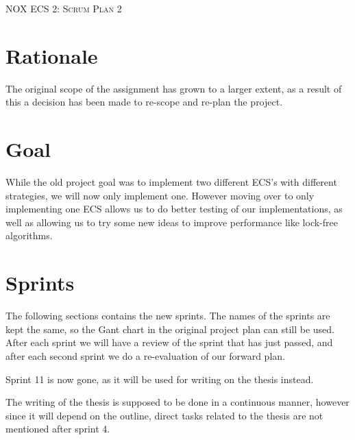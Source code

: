 \documentclass[hidelinks]{article}
\begin{document}
\begin{titlepage}
    \centering
    {\scshape\LARGE NOX ECS 2: Scrum Plan 2 \par}
    \vfill
    {\large \date{}\par}
\end{titlepage}

\tableofcontents
\pagebreak

\section{Rationale}
The original scope of the assignment has grown to a larger extent, as a result of this a decision has been made to re-scope and re-plan the project.


\section{Goal}
While the old project goal was to implement two different ECS's with different strategies, we will now only implement one.
However moving over to only implementing one ECS allows us to do better testing
of our implementations, as well as allowing us to try some new ideas to improve performance like lock-free algorithms.

\section{Sprints}
The following sections contains the new sprints. The names of the sprints are kept the same, so the Gant chart in the original project plan can still be used.
After each sprint we will have a review of the sprint that has just passed, and after each second sprint we do a re-evaluation of our forward plan.

Sprint 11 is now gone, as it will be used for writing on the thesis instead.

The writing of the thesis is supposed to be done in a continuous manner, however since it will depend on the outline, 
direct tasks related to the thesis are not mentioned after sprint 4.
\end{document}
